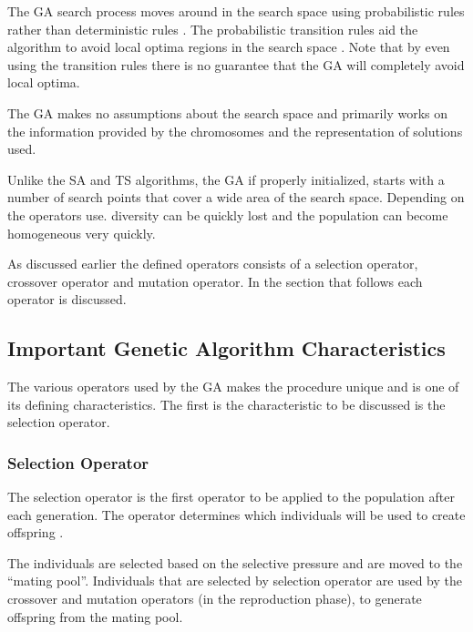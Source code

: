 The \gls{GA} search process moves around in the search space using probabilistic rules rather than deterministic rules \cite{FamilyGA}. The probabilistic transition rules aid the algorithm to avoid local optima regions in the search space \cite{HybridIntelliGA}. Note that by even using the transition rules there is no guarantee that the \gls{GA} will completely avoid local optima\cite{CompuIntelligenceIntro}.

The \gls{GA} makes no assumptions about the search space and primarily works on the information provided by the chromosomes and the representation of solutions used\cite{CompuIntelligenceIntro,ConstrainedGA,HybridIntelliGA}. 

Unlike the \gls{SA} and \gls{TS} algorithms, the \gls{GA} if properly initialized, starts with a number of search points that cover a wide area of the search space. Depending on the operators use. diversity can be quickly lost and the population can become homogeneous very quickly\cite{DistributedHierarchicalGA,FamilyGA,HybridIntelliGA}\label{GASearchPoints}.

As discussed earlier the defined operators consists of a selection operator, crossover operator and mutation operator\cite{SelfAdaptiveGA,MultiPopGA}. In the section that follows each operator is discussed.

\subsection{Important Genetic Algorithm Characteristics}
The various operators used by the \gls{GA} makes the procedure unique and is one of its defining characteristics. The first is the characteristic to be discussed is the selection operator.

\subsubsection{Selection Operator}
The selection operator is the first operator to be applied to the population after each generation. The operator determines which individuals will be used to create offspring \cite{CoactiveFuzzyGA,CombinedBranchBoundGA,ConstrainedGA}.

The individuals are selected based on the selective pressure and are moved to the ``mating pool''. Individuals that are selected by selection operator are used by the crossover and mutation operators (in the reproduction phase), to generate offspring from the mating pool\cite{AdaptiveSAGA,AcceleratingGA}.


